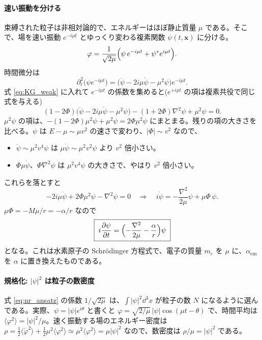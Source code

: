 \paragraph{速い振動を分ける}
束縛された粒子は非相対論的で、エネルギーはほぼ静止質量 $\mu$ である。そこで、場を速い振動 $e^{-i\mu t}$ とゆっくり変わる複素関数 $\psi(t,\bm x)$ に分ける。
\begin{equation}
\varphi=\frac{1}{\sqrt{2\mu}}\Bigl(\psi\,e^{-i\mu t}+\psi^*e^{i\mu t}\Bigr).
\label{eq:nr_ansatz}
\end{equation}
時間微分は
\begin{equation}
\partial_t^2\bigl(\psi e^{-i\mu t}\bigr)=\bigl(\ddot\psi-2i\mu\dot\psi-\mu^2\psi\bigr)e^{-i\mu t}.
\end{equation}
式 \eqref{eq:KG_weak} に入れて $e^{-i\mu t}$ の係数を集めると($e^{+i\mu t}$ の項は複素共役で同じ式を与える)
\begin{equation}
(1-2\Phi)\bigl(\ddot\psi-2i\mu\dot\psi-\mu^2\psi\bigr)-(1+2\Phi)\nabla^2\psi+\mu^2\psi=0.
\end{equation}
$\mu^2\psi$ の項は、$-(1-2\Phi)\mu^2\psi+\mu^2\psi=2\Phi\mu^2\psi$ にまとまる。残りの項の大きさを比べる。$\psi$ は $E-\mu\sim\mu v^2$ の速さで変わり、$|\Phi|\sim v^2$ なので、
\begin{itemize}
\item $\ddot\psi\sim\mu^2v^4\psi$ は $\mu\dot\psi\sim\mu^2v^2\psi$ より $v^2$ 倍小さい。
\item $\Phi\mu\dot\psi$、$\Phi\nabla^2\psi$ は $\mu^2v^4\psi$ の大きさで、やはり $v^2$ 倍小さい。
\end{itemize}
これらを落とすと
\begin{equation}
-2i\mu\dot\psi+2\Phi\mu^2\psi-\nabla^2\psi=0
\quad\Longrightarrow\quad
i\dot\psi=-\frac{\nabla^2}{2\mu}\psi+\mu\Phi\,\psi.
\end{equation}
$\mu\Phi=-M\mu/r=-\alpha/r$ なので
\begin{equation}
\boxed{\;i\frac{\partial\psi}{\partial t}=\Bigl(-\frac{\nabla^2}{2\mu}-\frac{\alpha}{r}\Bigr)\psi\;}
\label{eq:schrodinger}
\end{equation}
となる。これは水素原子の Schr\"odinger 方程式で、電子の質量 $m_e$ を $\mu$ に、$\alpha_\mathrm{em}$ を $\alpha$ に置き換えたものである。

\paragraph{規格化: $|\psi|^2$ は粒子の数密度}
式 \eqref{eq:nr_ansatz} の係数 $1/\sqrt{2\mu}$ は、$\int|\psi|^2\dd^3x$ が粒子の数 $N$ になるように選んである。実際、$\psi=|\psi|e^{i\theta}$ と書くと $\varphi=\sqrt{2/\mu}\,|\psi|\cos(\mu t-\theta)$ で、時間平均は $\langle\varphi^2\rangle=|\psi|^2/\mu$。速く振動する場のエネルギー密度は $\rho=\tfrac12\langle\dot\varphi^2\rangle+\tfrac12\mu^2\langle\varphi^2\rangle\simeq\mu^2\langle\varphi^2\rangle=\mu|\psi|^2$ なので、数密度は $\rho/\mu=|\psi|^2$ である。

